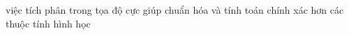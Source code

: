 \documentclass[preview]{standalone}
\begin{document}
\begin{center}
việc tích phân trong tọa độ cực giúp chuẩn hóa và tính toán chính xác hơn các thuộc tính hình học
\end{center}
\end{document}
